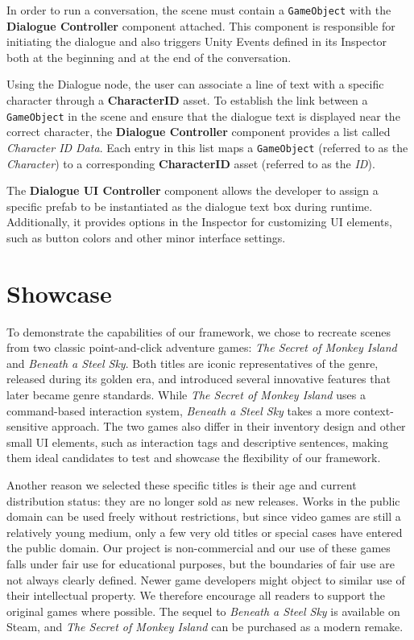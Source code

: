 In order to run a conversation, the scene must contain a \verb|GameObject| with the \textbf{Dialogue Controller} component attached. This component is responsible for initiating the dialogue and also triggers Unity Events defined in its Inspector both at the beginning and at the end of the conversation. 

Using the Dialogue node, the user can associate a line of text with a specific character through a \textbf{CharacterID} asset. To establish the link between a \verb|GameObject| in the scene and ensure that the dialogue text is displayed near the correct character, the \textbf{Dialogue Controller} component provides a list called \textit{Character ID Data}. Each entry in this list maps a \verb|GameObject| (referred to as the \textit{Character}) to a corresponding \textbf{CharacterID} asset (referred to as the \textit{ID}).

The \textbf{Dialogue UI Controller} component allows the developer to assign a specific prefab to be instantiated as the dialogue text box during runtime. Additionally, it provides options in the Inspector for customizing UI elements, such as button colors and other minor interface settings.

\section{Showcase}
To demonstrate the capabilities of our framework, we chose to recreate scenes from two classic point-and-click adventure games: \textit{The Secret of Monkey Island} and \textit{Beneath a Steel Sky}. Both titles are iconic representatives of the genre, released during its golden era, and introduced several innovative features that later became genre standards. While \textit{The Secret of Monkey Island} uses a command-based interaction system, \textit{Beneath a Steel Sky} takes a more context-sensitive approach. The two games also differ in their inventory design and other small UI elements, such as interaction tags and descriptive sentences, making them ideal candidates to test and showcase the flexibility of our framework.

Another reason we selected these specific titles is their age and current distribution status: they are no longer sold as new releases. Works in the public domain can be used freely without restrictions, but since video games are still a relatively young medium, only a few very old titles or special cases have entered the public domain.
Our project is non-commercial and our use of these games falls under fair use for educational purposes, but the boundaries of fair use are not always clearly defined. 
Newer game developers might object to similar use of their intellectual property. We therefore encourage all readers to support the original games where possible. The sequel to \textit{Beneath a Steel Sky} is available on Steam, and \textit{The Secret of Monkey Island} can be purchased as a modern remake.

